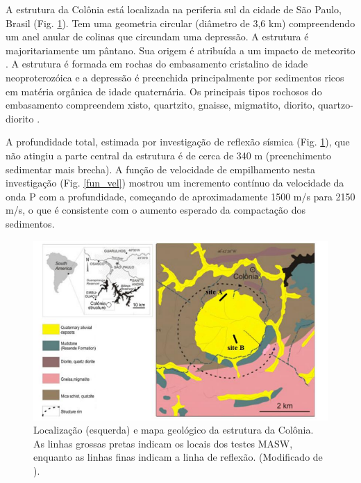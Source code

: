 \documentclass[smallextended]{svjour3}       %
\begin{document}
A estrutura da Colônia está localizada na periferia sul da cidade de São Paulo, Brasil (Fig. \ref{geologia}). Tem uma geometria circular (diâmetro de 3,6 km) compreendendo um anel anular de colinas que circundam uma depressão. A estrutura é majoritariamente um pântano. Sua origem é atribuída a um impacto de meteorito \citep{riccomini1989colonia}. A estrutura é formada em rochas do embasamento cristalino de idade neoproterozóica e a depressão é preenchida principalmente por sedimentos ricos em matéria orgânica de idade quaternária. Os principais tipos rochosos do embasamento compreendem xisto, quartzito, gnaisse, migmatito, diorito, quartzo-diorito \citep{sadowski1974tectonica}.

A profundidade total, estimada por investigação de reflexão sísmica (Fig. \ref{geologia}), que não atingiu a parte central da estrutura \citep{riccomini2011colonia} é de cerca de 340 m (preenchimento sedimentar mais brecha). A função de velocidade de empilhamento nesta investigação (Fig. \ref{fun_vel}) mostrou um incremento contínuo da velocidade da onda P com a profundidade, começando de aproximadamente 1500 m/s para 2150 m/s, o que é consistente com o aumento esperado da compactação dos sedimentos.

\begin{figure}[!hbtp]
  \begin{center}
  \includegraphics[scale=0.8]{Figures/fig1.png}
  \end{center}
  \caption{Localização (esquerda) e mapa geológico da estrutura da Colônia. As linhas grossas pretas indicam os locais dos testes MASW, enquanto as linhas finas indicam a linha de reflexão. (Modificado de \citealp{riccomini2011colonia}).
  }
  \label{geologia}
\end{figure}
\end{document}

